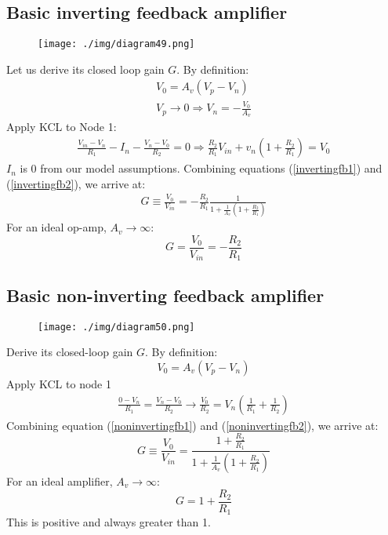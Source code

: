\subsection{Basic inverting feedback amplifier}
\begin{figure}[H]
  \centering
  \texttt{[image: ./img/diagram49.png]}
\end{figure}
Let us derive its closed loop gain $G$. By definition:
\begin{gather}
  V_0 = A_v(V_p - V_n)\\
  V_p \rightarrow 0 \Longrightarrow V_n = - \frac{V_0}{A_v} \label{invertingfb1}
\end{gather}
Apply KCL to Node 1:
\begin{gather}
  \frac{V_{in}-V_n}{R_1} - I_n - \frac{V_n - V_0}{R_2} = 0 \Longrightarrow \frac{R_2}{R_1}V_{in} + v_n \left( 1 + \frac{R_2}{R_1} \right) = V_0 \label{invertingfb2}
\end{gather}
$I_n$ is 0 from our model assumptions.
Combining equations (\ref{invertingfb1}) and (\ref{invertingfb2}), we arrive at:
\begin{gather}
  G \equiv \frac{V_0}{V_{in}} = -\frac{R_2}{R_1} \frac{1}{1 + \frac{1}{A_v}\left( 1 + \frac{R_2}{R_1}\right)}
\end{gather}
For an ideal op-amp, $A_v \rightarrow \infty$:
\begin{equation}
  G = \frac{V_0}{V_{in}} = - \frac{R_2}{R_1}
\end{equation}
\subsection{Basic non-inverting feedback amplifier}
\begin{figure}[H]
  \centering
  \texttt{[image: ./img/diagram50.png]}
\end{figure}
Derive its closed-loop gain $G$. By definition:
\begin{equation}
  V_0 = A_v (V_p - V_n) \label{noninvertingfb1}
\end{equation}
Apply KCL to node 1
\begin{gather}
  \frac{0 - V_n}{R_1} = \frac{V_n - V_0}{R_2} \rightarrow \frac{V_0}{R_2} = V_n \left(\frac{1}{R_1} + \frac{1}{R_2}\right) \label{noninvertingfb2}
\end{gather}
Combining equation (\ref{noninvertingfb1}) and (\ref{noninvertingfb2}), we arrive at:
\begin{equation}
  G \equiv \frac{V_0}{V_{in}} = \frac{1 + \frac{R_2}{R_1}}{1 + \frac{1}{A_v}\left(1 + \frac{R_2}{R_1}\right)}
\end{equation}
For an ideal amplifier, $A_v \rightarrow \infty$:
\begin{equation}
  G = 1 + \frac{R_2}{R_1}
\end{equation}
This is positive and always greater than 1.
